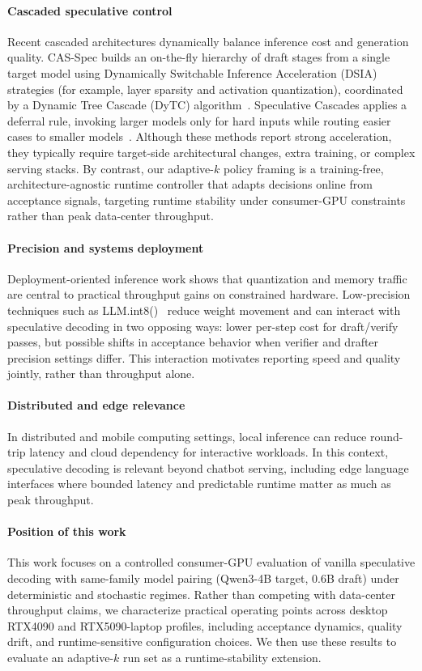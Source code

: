 \paragraph{Cascaded speculative control}
Recent cascaded architectures dynamically balance inference cost and generation
quality. CAS-Spec builds an on-the-fly hierarchy of draft stages from a single
target model using Dynamically Switchable Inference Acceleration (DSIA)
strategies (for example, layer sparsity and activation quantization),
coordinated by a Dynamic Tree Cascade (DyTC) algorithm~\cite{Ning2025CASSpec}.
Speculative Cascades applies a deferral rule, invoking larger models only for
hard inputs while routing easier cases to smaller models~\cite{Narasimhan2024FasterCascades}.
Although these methods report strong acceleration, they typically require
target-side architectural changes, extra training, or complex serving stacks.
By contrast, our adaptive-$k$ policy framing is a training-free, architecture-agnostic runtime
controller that adapts decisions online from acceptance signals, targeting
runtime stability under consumer-GPU constraints rather than peak data-center
throughput.

\paragraph{Precision and systems deployment}
Deployment-oriented inference work shows that quantization and memory traffic
are central to practical throughput gains on constrained hardware.
Low-precision techniques such as LLM.int8()~\cite{Dettmers2022Int8} reduce
weight movement and can interact with speculative decoding in two opposing
ways: lower per-step cost for draft/verify passes, but possible shifts in
acceptance behavior when verifier and drafter precision settings differ.
This interaction motivates reporting speed and quality jointly, rather than
throughput alone.

\paragraph{Distributed and edge relevance}
In distributed and mobile computing settings, local inference can reduce
round-trip latency and cloud dependency for interactive workloads. In this
context, speculative decoding is relevant beyond chatbot serving, including
edge language interfaces where bounded latency and predictable runtime matter
as much as peak throughput.

\paragraph{Position of this work}
This work focuses on a controlled consumer-GPU evaluation of vanilla
speculative decoding with same-family model pairing (Qwen3-4B target,
0.6B draft) under deterministic and stochastic regimes. Rather than
competing with data-center throughput claims, we characterize practical
operating points across desktop RTX4090 and RTX5090-laptop profiles,
including acceptance dynamics, quality drift, and runtime-sensitive
configuration choices. We then use these results to evaluate an adaptive-$k$
run set as a runtime-stability extension.
